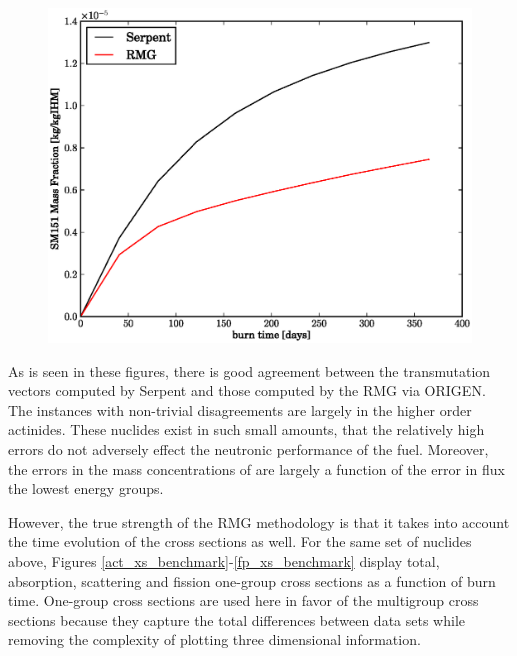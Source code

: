\begin{figure}[htbp]
\begin{center}
\includegraphics[scale=0.3]{multigroup_method/figs/benchmark/SM151_Mass_Fraction_.eps}
\end{center}
\end{figure}


As is seen in these figures, there is good agreement between the transmutation vectors computed by
Serpent and those computed by the RMG via ORIGEN.  The instances with non-trivial disagreements are 
largely in the higher order actinides.  These nuclides exist in such small amounts, that the relatively
high errors do not adversely effect the neutronic performance of the fuel.   Moreover, the errors in the
mass concentrations of are largely a function of the error in flux the lowest energy groups.  


However, the true strength of the RMG methodology is 
that it takes into account the time evolution of the cross sections as well.  For the same set 
of nuclides above, Figures \ref{act_xs_benchmark}-\ref{fp_xs_benchmark} display total, absorption,
scattering and fission one-group cross sections as a function of burn time.  One-group cross sections 
are used here in favor of the multigroup cross sections because they capture the total differences 
between data sets while removing the complexity of plotting three dimensional information.

